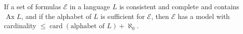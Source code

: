 If a set of formulas $\mathcal{E}$ in a language $L$ is consistent and complete and contains $\operatorname{Ax} L$, and if the alphabet of $L$ is sufficient for $\mathcal{E}$, then $\mathcal{E}$ has a model with cardinality $\leqslant \operatorname{card}(\text{alphabet of } L) + \aleph_0$.
